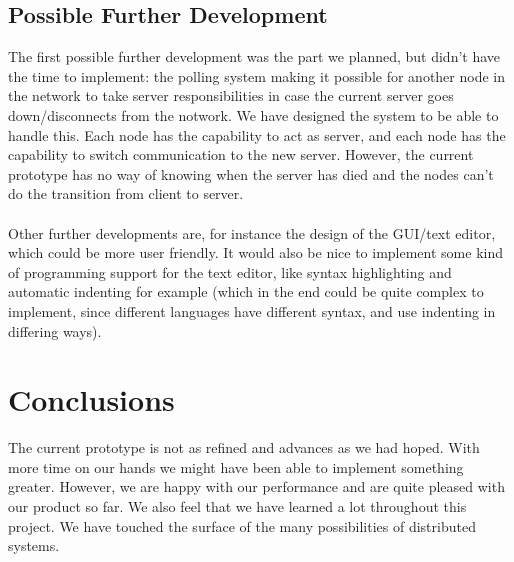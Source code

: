 \documentclass[12pt]{article}
\begin{document}

\subsection{Possible Further Development} %
\label{sub:possible_further_development}

The first possible further development was the part we planned, but didn't have the time to implement: the polling system making it possible for another node in the network to take server responsibilities in case the current server goes down/disconnects from the notwork. We have designed the system to be able to handle this. Each node has the capability to act as server, and each node has the capability to switch communication to the new server. However, the current prototype has no way of knowing when the server has died and the nodes can't do the transition from client to server. 
\\\\
Other further developments are, for instance the design of the GUI/text editor, which could be more user friendly. It would also be nice to implement some kind of programming support for the text editor, like syntax highlighting and automatic indenting for example (which in the end could be quite complex to implement, since different languages have different syntax, and use indenting in differing ways).




\section{Conclusions} %
\label{sec:conclusions}

The current prototype is not as refined and advances as we had hoped. With more time on our hands we might have been able to implement something greater. However, we are happy with our performance and are quite pleased with our product so far. We also feel that we have learned a lot throughout this project. We have touched the surface of the many possibilities of distributed systems.

\end{document}
